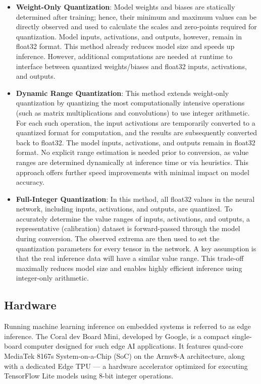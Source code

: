 {\begin{itemize}
\item \textbf{Weight-Only Quantization}: Model weights and biases are statically determined after training;
hence, their minimum and maximum values can be directly observed and used to calculate the scales and zero-points required for quantization.
Model inputs, activations, and outputs, however, remain in \gls{float32} format. This method already reduces model size and speeds up inference.
However, additional computations are needed at runtime to interface between quantized weights/biases and \gls{float32} inputs, activations, and outputs.
\item \textbf{Dynamic Range Quantization}: This method extends weight-only quantization by quantizing the most computationally intensive
operations (such as matrix multiplications and convolutions) to use integer arithmetic.
For each such operation, the input activations are temporarily converted to a quantized format for computation, and the results are subsequently converted back to \gls{float32}.
The model inputs, activations, and outputs remain in \gls{float32} format. No explicit range estimation is needed prior to conversion,
as value ranges are determined dynamically at inference time or via heuristics. This approach offers further speed improvements with minimal impact on model accuracy.
\item \textbf{Full-Integer Quantization}: In this method, all \gls{float32} values in the neural network, including inputs, activations, and outputs, are quantized.
To accurately determine the value ranges of inputs, activations, and outputs, a representative (calibration) dataset is forward-passed through the model during conversion.
The observed extrema are then used to set the quantization parameters for every tensor in the network. A key assumption is that the real inference data will have a similar value range.
This trade-off maximally reduces model size and enables highly efficient inference using integer-only arithmetic.
\end{itemize}

\subsection{Hardware}
\label{subsec:hardware}

Running machine learning inference on embedded systems is referred to as edge inference.
The Coral dev Board Mini, developed by Google, is a compact single-board computer designed for such edge AI applications.
It features quad-core MediaTek 8167s System-on-a-Chip (SoC) on the Armv8-A architecture,
along with a dedicated Edge TPU --- a hardware accelerator optimized for executing TensorFlow Lite models using 8-bit integer operations.

}
